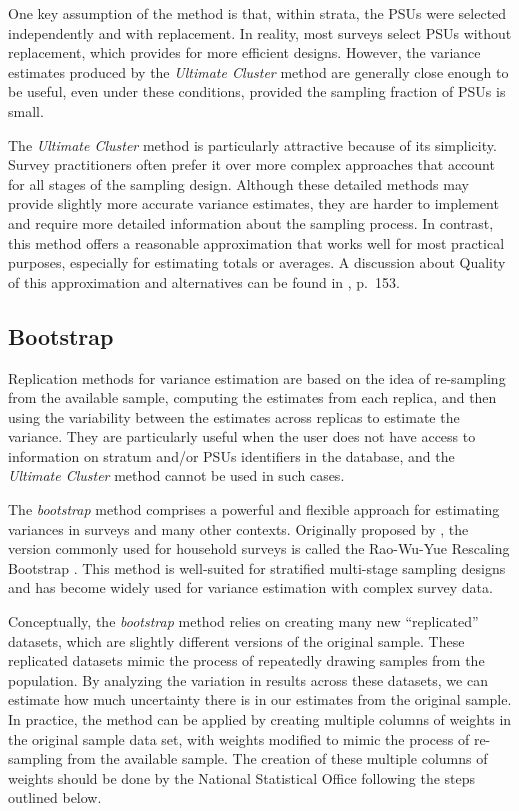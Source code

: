 \documentclass[
  12pt,
]{book}
\begin{document}
One key assumption of the method is that, within strata, the PSUs were selected independently and with replacement. In reality, most surveys select PSUs without replacement, which provides for more efficient designs. However, the variance estimates produced by the \emph{Ultimate Cluster} method are generally close enough to be useful, even under these conditions, provided the sampling fraction of PSUs is small.

The \emph{Ultimate Cluster} method is particularly attractive because of its simplicity. Survey practitioners often prefer it over more complex approaches that account for all stages of the sampling design. Although these detailed methods may provide slightly more accurate variance estimates, they are harder to implement and require more detailed information about the sampling process. In contrast, this method offers a reasonable approximation that works well for most practical purposes, especially for estimating totals or averages. A discussion about Quality of this approximation and alternatives can be found in \citep{SSW92}, p.~153.

\hypertarget{bootstrap}{%
\subsection{Bootstrap}\label{bootstrap}}

Replication methods for variance estimation are based on the idea of re-sampling from the available sample, computing the estimates from each replica, and then using the variability between the estimates across replicas to estimate the variance. They are particularly useful when the user does not have access to information on stratum and/or PSUs identifiers in the database, and the \emph{Ultimate Cluster} method cannot be used in such cases.

The \emph{bootstrap} method comprises a powerful and flexible approach for estimating variances in surveys and many other contexts. Originally proposed by \citet{Efron1979}, the version commonly used for household surveys is called the Rao-Wu-Yue Rescaling Bootstrap \citep{Rao1992}. This method is well-suited for stratified multi-stage sampling designs and has become widely used for variance estimation with complex survey data.

Conceptually, the \emph{bootstrap} method relies on creating many new ``replicated'' datasets, which are slightly different versions of the original sample. These replicated datasets mimic the process of repeatedly drawing samples from the population. By analyzing the variation in results across these datasets, we can estimate how much uncertainty there is in our estimates from the original sample. In practice, the method can be applied by creating multiple columns of weights in the original sample data set, with weights modified to mimic the process of re-sampling from the available sample. The creation of these multiple columns of weights should be done by the National Statistical Office following the steps outlined below.
\end{document}
